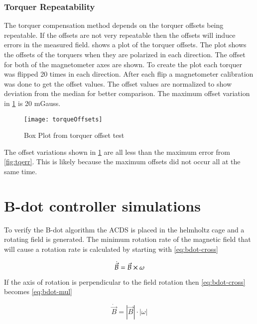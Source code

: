 \clearpage
\subsubsection{Torquer Repeatability}

The torquer compensation method depends on the torquer offsets being repeatable. If the offsets are not very repeatable then the offsets will induce errors in the measured field.  shows a plot of the torquer offsets. The plot shows the offsets of the torquers when they are polarized in each direction. The offset for both of the magnetometer axes are shown. To create the plot each torquer was flipped 20 times in each direction. After each flip a magnetometer calibration was done to get the offset values. The offset values are normalized to show deviation from the median for better comparison. The maximum offset variation in \cref{fig:tqoff} is 20 mGauss.

\begin{figure}[!ht]
    \centering
    \texttt{[image: torqueOffsets]}
    \caption{Box Plot from torquer offset test}
    \label{fig:tqoff}
\end{figure}

The offset variations shown in \cref{fig:tqoff} are all less than the maximum error from \cref{fig:tqerr}. This is likely because the maximum offsets did not occur all at the same time.

\section{B-dot controller simulations}

To verify the B-dot algorithm the \ac{ACDS} is placed in the helmholtz cage and a rotating field is generated. The minimum rotation rate of the magnetic field that will cause a rotation rate is calculated by starting with \cref{eq:bdot-cross}

\begin{equation}
    \dot{\vec{B}} = \vec{B} \times \omega
    \label{eq:bdot-cross}
\end{equation}

If the axis of rotation is perpendicular to the field rotation then \cref{eq:bdot-cross} becomes \cref{eq:bdot-mul}

\begin{equation}
    \dot{\vec{B}} = \left| \vec{B} \right| \cdot \left| \omega \right|
    \label{eq:bdot-mul}
\end{equation}

